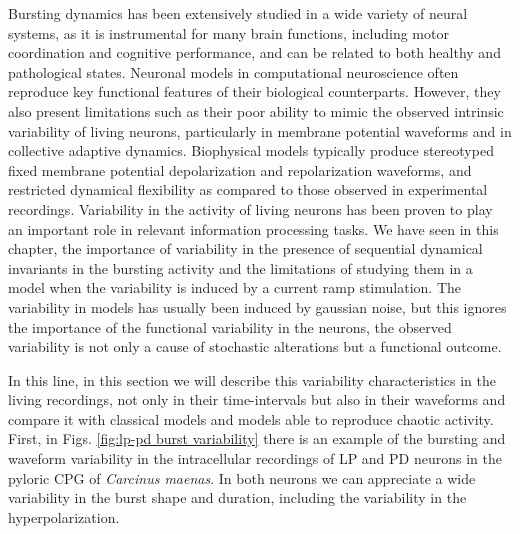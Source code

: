 Bursting dynamics has been extensively studied in a wide variety of neural systems, as it is instrumental for many brain functions, including motor coordination and cognitive performance, and can be related to both healthy and pathological states. Neuronal models in computational neuroscience often reproduce key functional features of their biological counterparts. However, they also present limitations such as their poor ability to mimic the observed intrinsic variability of living neurons, particularly in membrane potential waveforms and in collective adaptive dynamics. Biophysical models typically produce stereotyped fixed membrane potential depolarization and repolarization waveforms, and restricted dynamical flexibility as compared to those observed in experimental recordings. Variability in the activity of living neurons has been proven to play an important role in relevant information processing tasks. We have seen in this chapter, the importance of variability in the presence of sequential dynamical invariants in the bursting activity and the limitations of studying them in a model when the variability is induced by a current ramp stimulation. The variability in models has usually been induced by gaussian noise, but this ignores the importance of the functional variability in the neurons, the observed variability is not only a cause of stochastic alterations but a functional outcome. 

In this line, in this section we will describe this variability characteristics in the living recordings, not only in their time-intervals but also in their waveforms and compare it with classical models and models able to reproduce chaotic activity. 
First, in Figs. \ref{fig:lp-pd burst variability} there is an example of the bursting and waveform variability in the intracellular recordings of LP and PD neurons in the pyloric CPG of \textit{Carcinus maenas}. In both neurons we can appreciate a wide variability in the burst shape and duration, including the variability in the hyperpolarization.

